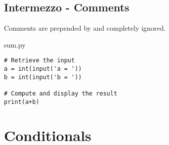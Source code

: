 \documentclass[aspectratio=1610,t]{beamer}
\begin{document}
\subsection{Intermezzo - Comments}
\begin{pframe}
 Comments are prepended by \emp{\#} and completely ignored.
 \begin{pythonfile}{sum.py}
  \begin{verbatim}
# Retrieve the input
a = int(input('a = '))
b = int(input('b = '))

# Compute and display the result
print(a+b)
  \end{verbatim}
 \end{pythonfile}
\end{pframe}


\section{Conditionals}

\begin{pframe}
 \begin{center}
  
 \end{center}
\end{pframe}

\begin{pframe}
 \begin{center}
  
 \end{center}
\end{pframe}

\begin{pframe}
 \begin{center}
  
 \end{center}
\end{pframe}
\end{document}
